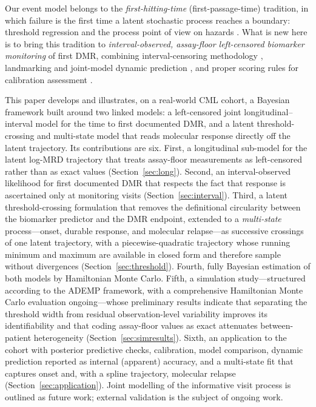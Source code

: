 \documentclass[11pt]{article}
\begin{document}
Our event model belongs to the \emph{first-hitting-time} (first-passage-time)
tradition, in which failure is the first time a latent stochastic process
reaches a boundary: threshold regression \cite{LeeWhitmore2006ThresholdRegression}
and the process point of view on hazards
\cite{AalenGjessing2001ProcessView,AalenBorganGjessing2008}. What is new here is
to bring this tradition to \emph{interval-observed, assay-floor left-censored
biomarker monitoring} of first DMR, combining interval-censoring methodology
\cite{Sun2006IntervalCensored}, landmarking and joint-model dynamic prediction
\cite{vanHouwelingen2007Landmarking,Rizopoulos2011DynamicPredictions}, and proper
scoring rules for calibration assessment \cite{GneitingRaftery2007ProperScoring}.

This paper develops and illustrates, on a real-world CML cohort, a Bayesian
framework built around two linked models: a left-censored joint
longitudinal--interval model for the time to first documented DMR, and a latent
threshold-crossing and multi-state model that reads molecular response directly
off the latent trajectory. Its contributions are six. First, a longitudinal
sub-model for the latent log-MRD trajectory that treats assay-floor
measurements as left-censored rather than as exact values
(Section~\ref{sec:long}). Second, an interval-observed likelihood for first
documented DMR that respects the fact that response is ascertained only at
monitoring visits (Section~\ref{sec:interval}). Third, a latent
threshold-crossing formulation that removes the definitional circularity
between the biomarker predictor and the DMR endpoint, extended to a
\emph{multi-state} process---onset, durable response, and molecular
relapse---as successive crossings of one latent trajectory, with a
piecewise-quadratic trajectory whose running minimum and maximum are available
in closed form and therefore sample without divergences
(Section~\ref{sec:threshold}). Fourth, fully Bayesian estimation of both models
by Hamiltonian Monte Carlo. Fifth, a simulation study---structured according to the ADEMP framework, with
a comprehensive Hamiltonian Monte Carlo evaluation ongoing---whose preliminary
results indicate that separating the threshold width from residual observation-level variability
improves its identifiability and that coding assay-floor values as exact
attenuates between-patient heterogeneity (Section~\ref{sec:simresults}). Sixth, an application to the cohort with
posterior predictive checks, calibration, model comparison, dynamic prediction
reported as internal (apparent) accuracy, and a multi-state fit that captures
onset and, with a spline trajectory, molecular relapse
(Section~\ref{sec:application}). Joint modelling of the informative visit
process is outlined as future work; external validation is the subject of
ongoing work.
\end{document}
